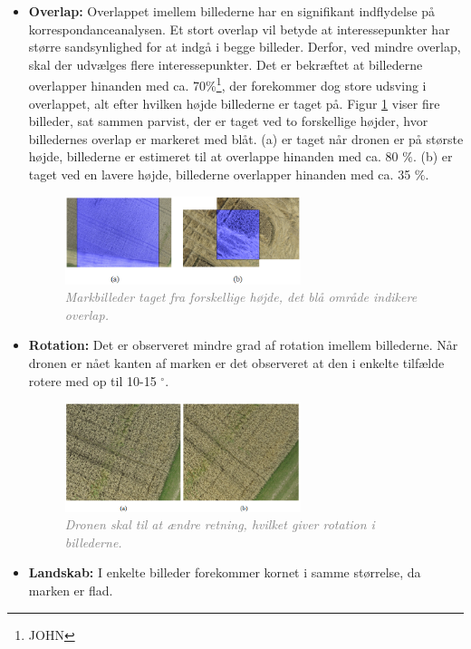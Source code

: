 \begin{itemize}
\item{\textbf{Overlap:} Overlappet imellem billederne har en signifikant indflydelse på korrespondanceanalysen. Et stort overlap vil betyde at interessepunkter har større sandsynlighed for at indgå i begge billeder. Derfor, ved mindre overlap, skal der udvælges flere interessepunkter. Det er bekræftet at billederne overlapper hinanden med ca. 70\%\footnote{JOHN}, der forekommer dog store udsving i overlappet, alt efter hvilken højde billederne er taget på. Figur \ref{fig:overlap} viser fire billeder, sat sammen parvist, der er taget ved to forskellige højder, hvor billedernes overlap er markeret med blåt. (a) er taget når dronen er på største højde, billederne er estimeret til at overlappe hinanden med ca. 80 $\%$. (b) er taget ved en lavere højde, billederne overlapper hinanden med ca. 35 $\%$.
\begin{figure}[H]
    \centering
    \includegraphics[width=0.65\textwidth]{fig/17.png}
     \vspace{-1em}
    \begin{center}    
       \caption{\textcolor{gray}{\footnotesize \textit{Markbilleder taget fra forskellige højde, det blå område indikere overlap.}}}
    \label{fig:overlap}
     \end{center}
     \vspace{-2.5em}
  \end{figure} \noindent }
\item{\textbf{Rotation:} Det er observeret mindre grad af rotation imellem billederne. Når dronen er nået kanten af marken er det observeret at den i enkelte tilfælde rotere med op til 10-15 $^{\circ}$.
\begin{figure}[H]
    \centering
    \includegraphics[width=0.65\textwidth]{fig/19.png}
     \vspace{-1em}
    \begin{center} 
       \caption{\textcolor{gray}{\footnotesize \textit{Dronen skal til at ændre retning, hvilket giver rotation i billederne.}}}
    \label{fig:rotation}
     \end{center}
     \vspace{-2.5em}
  \end{figure} \noindent}
\item{\textbf{Landskab:} I enkelte billeder forekommer kornet i samme størrelse, da marken er flad.

}
\end{itemize}
